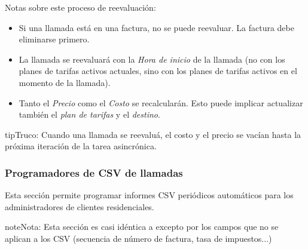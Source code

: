 \documentclass[letterpaper,10pt,spanish]{sphinxmanual}
\begin{document}
Notas sobre este proceso de reevaluación:
\begin{itemize}
\item {} 
Si una llamada está en una factura, no se puede reevaluar. La factura debe eliminarse primero.

\item {} 
La llamada se reevaluará con la \emph{Hora de inicio} de la llamada (no con los planes de tarifas activos actuales, sino con los planes de tarifas activos en el momento de la llamada).

\item {} 
Tanto el \emph{Precio} como el \emph{Costo} se recalcularán. Esto puede implicar actualizar también el \emph{plan de tarifas} y el \emph{destino}.

\end{itemize}

\begin{notice}{tip}{Truco:}
Cuando una llamada se reevaluá, el costo y el precio se vacían hasta la próxima iteración de la tarea asincrónica.
\end{notice}


\subsubsection{Programadores de CSV de llamadas}
\label{administration_portal/client/residential/calls/call_csv_schedulers:call-csv-schedulers}\label{administration_portal/client/residential/calls/call_csv_schedulers::doc}
Esta sección permite programar informes CSV periódicos automáticos para los administradores de clientes residenciales.

\begin{notice}{note}{Nota:}
Esta sección es casi idéntica a {\hyperref[administration_portal/brand/invoicing/invoice_schedulers:invoice\string-schedulers]{}} excepto por los campos que no se aplican a los CSV (secuencia de número de factura, tasa de impuestos...)
\end{notice}
\end{document}
